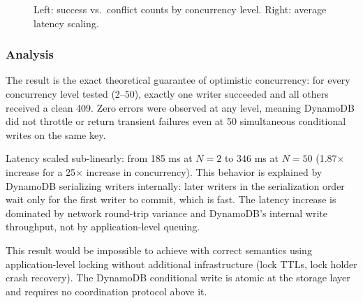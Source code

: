 \documentclass[11pt,letterpaper]{article}
\begin{document}
\begin{figure}[H]
\centering
{}
\hfill
{}
\caption{Left: success vs.\ conflict counts by concurrency level. Right: average latency scaling.}
\end{figure}

\subsubsection{Analysis}

\begin{resultbox}
The result is the exact theoretical guarantee of optimistic concurrency: for every concurrency level tested (2--50), exactly one writer succeeded and all others received a clean 409. Zero errors were observed at any level, meaning DynamoDB did not throttle or return transient failures even at 50 simultaneous conditional writes on the same key.

Latency scaled sub-linearly: from 185 ms at $N=2$ to 346 ms at $N=50$ (1.87$\times$ increase for a 25$\times$ increase in concurrency). This behavior is explained by DynamoDB serializing writers internally: later writers in the serialization order wait only for the first writer to commit, which is fast. The latency increase is dominated by network round-trip variance and DynamoDB's internal write throughput, not by application-level queuing.

This result would be impossible to achieve with correct semantics using application-level locking without additional infrastructure (lock TTLs, lock holder crash recovery). The DynamoDB conditional write is atomic at the storage layer and requires no coordination protocol above it.
\end{resultbox}
\end{document}
